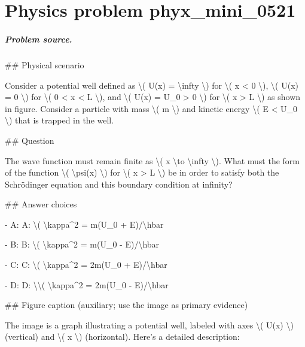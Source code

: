 
\chapter{Physics problem phyx\_mini\_0521}
\label{ch:PhyXMiniProblems_problem_phyx_mini_0521}

\paragraph{Problem source.}
\#\# Physical scenario

Consider a potential well defined as \textbackslash{}( U(x) = \textbackslash{}infty \textbackslash{}) for \textbackslash{}( x < 0 \textbackslash{}), \textbackslash{}( U(x) = 0 \textbackslash{}) for \textbackslash{}( 0 < x < L \textbackslash{}), and \textbackslash{}( U(x) = U\_0 > 0 \textbackslash{}) for \textbackslash{}( x > L \textbackslash{}) as shown in figure. Consider a particle with mass \textbackslash{}( m \textbackslash{}) and kinetic energy \textbackslash{}( E < U\_0 \textbackslash{}) that is trapped in the well.

\#\# Question

The wave function must remain finite as \textbackslash{}( x \textbackslash{}to \textbackslash{}infty \textbackslash{}). What must the form of the function \textbackslash{}( \textbackslash{}psi(x) \textbackslash{}) for \textbackslash{}( x > L \textbackslash{}) be in order to satisfy both the Schrödinger equation and this boundary condition at infinity?

\#\# Answer choices

- A: A: \textbackslash{}( \textbackslash{}kappa\textasciicircum{}2 = m(U\_0 + E)/\textbackslash{}hbar

- B: B: \textbackslash{}( \textbackslash{}kappa\textasciicircum{}2 = m(U\_0 - E)/\textbackslash{}hbar

- C: C: \textbackslash{}( \textbackslash{}kappa\textasciicircum{}2 = 2m(U\_0 + E)/\textbackslash{}hbar

- D: D: \textbackslash{}\textbackslash{}( \textbackslash{}kappa\textasciicircum{}2 = 2m(U\_0 - E)/\textbackslash{}hbar

\#\# Figure caption (auxiliary; use the image as primary evidence)

The image is a graph illustrating a potential well, labeled with axes \textbackslash{}( U(x) \textbackslash{}) (vertical) and \textbackslash{}( x \textbackslash{}) (horizontal). Here's a detailed description:

